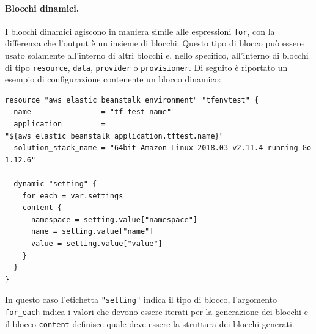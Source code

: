 \paragraph{Blocchi dinamici.}

I blocchi dinamici agiscono in maniera simile alle espressioni \verb|for|, con la differenza che l'output è un insieme di blocchi. Questo tipo di blocco può essere usato solamente all'interno di altri blocchi e, nello specifico, all'interno di blocchi di tipo \verb|resource|, \verb|data|, \verb|provider| o \verb|provisioner|. Di seguito è riportato un esempio di configurazione contenente un blocco dinamico:
\begin{lstlisting}[language=hcl]
resource "aws_elastic_beanstalk_environment" "tfenvtest" {
  name                = "tf-test-name"
  application         = "${aws_elastic_beanstalk_application.tftest.name}"
  solution_stack_name = "64bit Amazon Linux 2018.03 v2.11.4 running Go 1.12.6"

  dynamic "setting" {
    for_each = var.settings
    content {
      namespace = setting.value["namespace"]
      name = setting.value["name"]
      value = setting.value["value"]
    }
  }
}
\end{lstlisting}
In questo caso l'etichetta \verb|"setting"| indica il tipo di blocco, l'argomento \verb|for_each| indica i valori che devono essere iterati per la generazione dei blocchi e il blocco \verb|content| definisce quale deve essere la struttura dei blocchi generati.